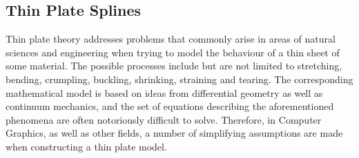 \documentclass[11pt]{report}
\begin{document}
\subsection{Thin Plate Splines}
Thin plate theory addresses problems that commonly arise in areas of natural sciences and engineering when trying to model the behaviour of a thin sheet of some material. The possible processes include but are not limited to stretching, bending, crumpling, buckling, shrinking, straining and tearing. The corresponding mathematical model is based on ideas from differential geometry as well as continuum mechanics, and the set of equations describing the aforementioned phenomena are often notoriously difficult to solve. Therefore, in Computer Graphics, as well as other fields, a number of simplifying assumptions are made when constructing a thin plate model. 
\end{document}
